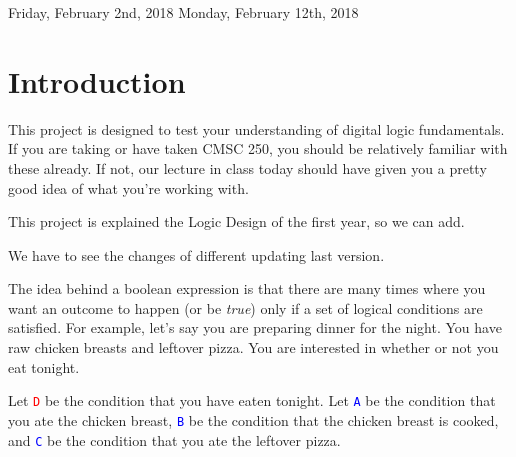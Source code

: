 \documentclass{article}
\begin{document}
\newcommand{\mysubsection}[1]{
    {\fontsize{13}{15}\selectfont\bf \item #1}}
    
\newenvironment{subenv}[1]
{\section{#1}\vspace{.5em}\begin{enumerate}}
{\end{enumerate}}

\newcommand{\varin}[1]{\textcolor{blue}{\texttt{#1}}}
\newcommand{\varout}[1]{\textcolor{red}{\texttt{#1}}}



\large

            {Friday, February 2nd, 2018}
            {Monday, February 12th, 2018}

\section{Introduction}
    \par This project is designed to test your understanding of digital logic fundamentals.  If you are taking or have taken CMSC 250, you should be relatively familiar with these already.  If not, our lecture in class today should have given you a pretty good idea of what you're working with.
    \par This project is explained the Logic Design of the first year, so we can add.
    \par We have to see the changes of different updating last version.
    
    \par The idea behind a boolean expression is that there are many times where you want an outcome to happen (or be \emph{true}) only if a set of logical conditions are satisfied.  For example, let's say you are preparing dinner for the night.  You have raw chicken breasts and leftover pizza.  You are interested in whether or not you eat tonight.  
    
    \par Let \varout{D} be the condition that you have eaten tonight.  Let \varin{A} be the condition that you ate the chicken breast, \varin{B} be the condition that the chicken breast is cooked, and \varin{C} be the condition that you ate the leftover pizza.
    
\end{document}
